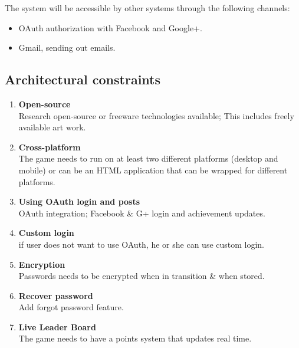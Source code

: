 \documentclass[letterpaper]{article}
\begin{document}
				The system will be accessible by other systems through the following channels:
				\begin{itemize}
					\item OAuth authorization with Facebook and Google+.
					\item Gmail, sending out emails.
				\end{itemize}
				
			\vspace{0.2in}
			\subsection*{ Architectural constraints }
			\vspace{0.1in}
					\vspace{0.1in}
		
			
				\begin{enumerate}
					\item \textbf{Open-source}
					\\Research open-source or freeware technologies available; This includes freely available art work.
					
					\item \textbf{Cross-platform}
					\\The game needs to run on at least two different platforms (desktop and mobile) or can be an HTML application that can be wrapped for different platforms.
					
					\item \textbf{Using OAuth login and posts}
					\\OAuth integration; Facebook \& G+ login and achievement updates.
					
					\item \textbf{Custom login}
					\\if user does not want to use OAuth, he or she can use custom login.
					
					\item \textbf{Encryption}
					\\Passwords needs to be encrypted when in transition \& when stored.
					
					\item \textbf{Recover password}
					\\Add forgot password feature.
									
					\item \textbf{Live Leader Board}
					\\The game needs to have a points system that updates real time.
					
				\end{enumerate}
			
\end{document}
